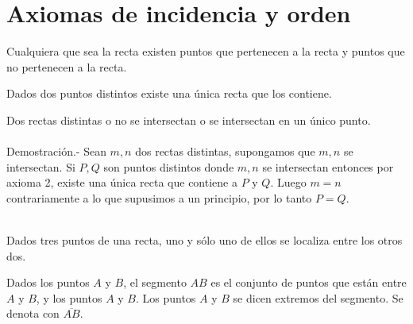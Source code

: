 \chapter{Axiomas de incidencia y orden}

\begin{tcolorbox}[colframe=white]
    \begin{axioma}
	Cualquiera que sea la recta existen puntos que pertenecen a la recta y puntos que no pertenecen a la recta.
    \end{axioma}
\end{tcolorbox}

\begin{tcolorbox}[colframe=white]
    \begin{axioma}
	Dados dos puntos distintos existe una única recta que los contiene.
    \end{axioma}
\end{tcolorbox}

    \begin{proposicion}
	Dos rectas distintas o no se intersectan o se intersectan en un único punto.\\\\
	    Demostración.-\; Sean $m,n$ dos rectas distintas, supongamos que $m,n$ se intersectan. Si $P,Q$ son puntos distintos donde $m,n$ se intersectan entonces por axioma 2, existe una única recta que contiene a $P$ y $Q$. Luego $m=n$ contrariamente a lo que supusimos a un principio, por lo tanto $P=Q$.\\\\
    \end{proposicion}

\begin{tcolorbox}[colframe=white]
    \begin{axioma}
	Dados tres puntos de una recta, uno y sólo uno de ellos se localiza entre los otros dos.
    \end{axioma}
\end{tcolorbox}

\begin{tcolorbox}[colframe=white]
    \begin{def.}[Segmento AB]
	Dados los puntos $A$ y $B$, el segmento $AB$ es el conjunto de puntos que están entre $A$ y $B$, y los puntos $A$ y $B$. Los puntos $A$ y $B$ se dicen extremos del segmento. Se denota con $\overline{AB}$.	
    \end{def.}
\end{tcolorbox}

